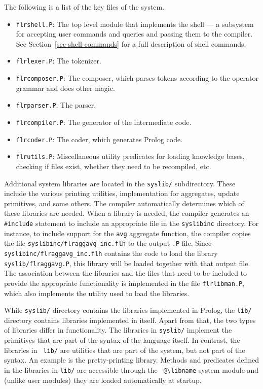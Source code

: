 \documentclass[11pt]{article}
\newcommand{\ERGO}{\mbox{\smaller{\ensuremath{\cal{E}}\smaller{{\sc{RGO}}}}}\xspace}
\newcommand{\FLSYSTEM}{\ERGO}
\newcommand{\bs}{\textbackslash}
\begin{document}
The following is a list of the key files of the system.
\begin{itemize}
\item \texttt{flrshell.P}: The top level module that implements the
  \FLSYSTEM shell --- a subsystem for accepting user commands and queries and
  passing them to the compiler.  See Section~\ref{sec-shell-commands} for a
  full description of shell commands.
\item \texttt{flrlexer.P}: The \FLSYSTEM tokenizer.
\item \texttt{flrcomposer.P}: The \FLSYSTEM composer, which parses tokens
  according to the operator grammar and does other magic.
\item \texttt{flrparser.P}: The \FLSYSTEM parser.
\item \texttt{flrcompiler.P}: The generator of the intermediate code.
\item \texttt{flrcoder.P}: The \FLSYSTEM coder, which generates Prolog code.
\item \texttt{flrutils.P}: Miscellaneous utility predicates for loading
  knowledge bases, checking if files exist, whether they need to be recompiled,
  etc.
\end{itemize}
Additional system libraries are located in the {\tt syslib/} subdirectory.
These include the various printing utilities, implementation for
aggregates, update primitives, and some others. The compiler automatically
determines which of these libraries are needed. When a
library is needed, the compiler generates an {\tt \#include} statement to
include an appropriate file in the {\tt syslibinc} directory. For instance,
to include support for the {\tt avg} aggregate function, the compiler
copies the file {\tt syslibinc/flraggavg\_inc.flh} to the output {\tt .P}
file.  Since {\tt syslibinc/flraggavg\_inc.flh} contains the code to load
the library {\tt syslib/flraggavg.P}, this library will be loaded together
with that output file. The association between the libraries and the files
that need to be included to provide the appropriate functionality is
implemented in the file {\tt flrlibman.P}, which also implements the
utility used to load the libraries.

While {\tt syslib/} directory contains the libraries implemented in Prolog,
the {\tt lib/} directory contains libraries implemented in \FLSYSTEM itself.
Apart from that, the two types of libraries differ in functionality.  The
libraries in {\tt syslib/} implement the primitives that are part of the
syntax of the \FLSYSTEM language itself. In contrast, the libraries in {\tt
  lib/} are utilities that are part of the system, but not part of the
syntax. An example is the pretty-printing library.  Methods and predicates
defined in the libraries in {\tt lib/} are accessible through the {\tt
  @\bs{}libname} system module and (unlike user modules) they are loaded
automatically at startup.
\end{document}
